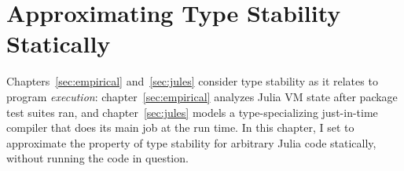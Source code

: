 \chapter{Approximating Type Stability Statically}\label{chap:approx}

\lstset{language=julia}







%





Chapters~\ref{sec:empirical} and~\ref{sec:jules} consider type stability as it
relates to program \emph{execution}: chapter~\ref{sec:empirical} analyzes Julia
VM state after package test suites ran, and chapter~\ref{sec:jules} models a
type-specializing just-in-time compiler that does its main job at the run time.
In this chapter, I set to approximate the property of type stability for
arbitrary Julia code statically, without running the code in question.

